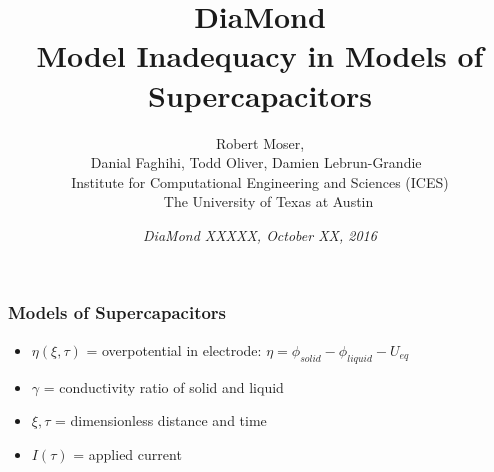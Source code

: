 \documentclass[8pt]{beamer}
\title[Model Inadequacy in Supercapacitors]{
DiaMond\\
{\small Model Inadequacy in Models of Supercapacitors}
}
\author[Moser et al]{
Robert Moser,\\ 
Danial Faghihi,
Todd Oliver,
Damien Lebrun-Grandie
$~$\\
{\small
Institute for Computational Engineering and Sciences (ICES)\\
$\quad~$The University of Texas at Austin
}
}
\date[DiaMond October 2016]{
{\it DiaMond XXXXX,
October XX, 2016
}
}
\begin{document}
\begin{frame}
\frametitle{Models of Supercapacitors}
\vfill

\begin{itemize}

\item $\eta(\xi,\tau)$ = overpotential in electrode: $\eta = \phi_{solid}-\phi_{liquid}-U_{eq}$\\
\item $\gamma$ = conductivity ratio of solid and liquid \\
\item $\xi, \tau$ = dimensionless distance and time \\
\item $I(\tau)$ = applied current


\end{itemize}
\end{frame}
\end{document}
